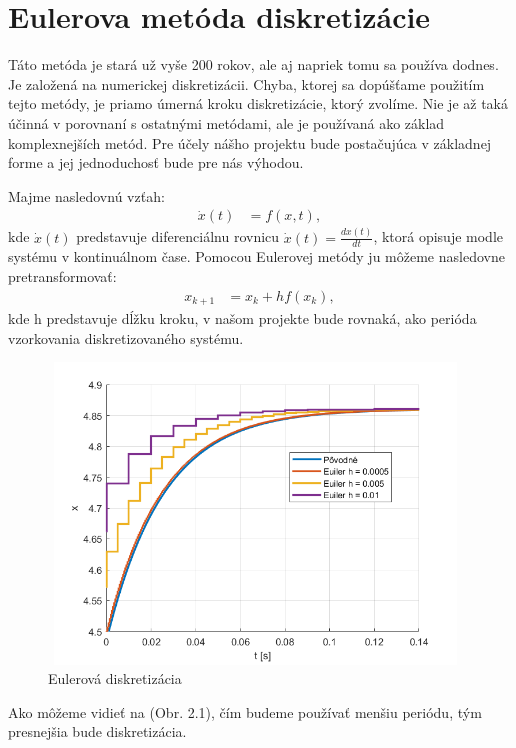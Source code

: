 \section{Eulerova metóda diskretizácie}
\label{se:diskretizacia}
Táto metóda je stará už vyše 200 rokov, ale aj napriek tomu sa používa dodnes. Je založená na numerickej diskretizácii. Chyba, ktorej sa dopúšťame použitím tejto metódy, je priamo úmerná kroku diskretizácie, ktorý zvolíme. Nie je až taká účinná v porovnaní s ostatnými metódami, ale je používaná ako základ komplexnejších metód. Pre účely nášho projektu bude postačujúca v základnej forme a jej jednoduchosť bude pre nás výhodou.

Majme nasledovnú vzťah:
\begin{align}
		\dot{x}(t) &= f(x,t),
\end{align}
kde $\dot{x}(t)$ predstavuje diferenciálnu rovnicu $\dot{x}(t)=\frac{dx(t)}{dt}$, ktorá opisuje modle systému v kontinuálnom čase. Pomocou Eulerovej metódy ju môžeme nasledovne pretransformovať:
\begin{align}
	x_{k+1} &= x_{k} + hf(x_{k}),
\end{align}
kde h predstavuje dĺžku kroku, v našom projekte bude rovnaká, ako perióda vzorkovania diskretizovaného systému.
\begin{figure}[H]
	\centering
	\includegraphics[width=11cm,height=8cm]{images/Euler_method}
	\caption{Eulerová diskretizácia}
\end{figure}
Ako môžeme vidieť na (Obr. 2.1), čím budeme používať menšiu periódu, tým presnejšia bude diskretizácia.
